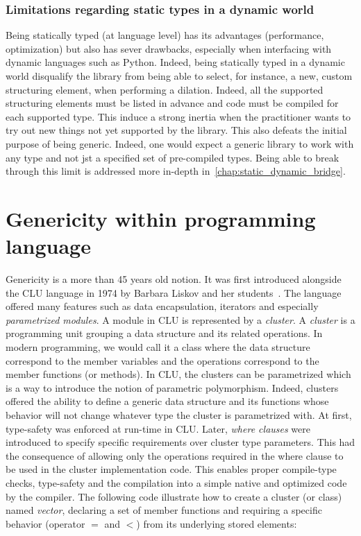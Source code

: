 \subsubsection{Limitations regarding static types in a dynamic world}

Being statically typed (at language level) has its advantages (performance, optimization) but also has sever drawbacks,
especially when interfacing with dynamic languages such as Python. Indeed, being statically typed in a dynamic world
disqualify the library from being able to select, for instance, a new, custom structuring element, when performing a
dilation. Indeed, all the supported structuring elements must be listed in advance and code must be compiled for each
supported type. This induce a strong inertia when the practitioner wants to try out new things not yet supported by the
library. This also defeats the initial purpose of being generic. Indeed, one would expect a generic library to work with
any type and not jst a specified set of pre-compiled types. Being able to break through this limit is addressed more
in-depth in~\cref{chap:static_dynamic_bridge}.




\section{Genericity within programming language}
\label{sec:gen.genericity.within.programming.languages}

Genericity is a more than 45 years old notion. It was first introduced alongside the CLU language in 1974 by Barbara
Liskov and her students~\parencite{liskov.1993.cluart}. The language offered many features such as data encapsulation,
iterators and especially \emph{parametrized modules}. A module in CLU is represented by a \emph{cluster}. A
\emph{cluster} is a programming unit grouping a data structure and its related operations. In modern programming, we
would call it a class where the data structure correspond to the member variables and the operations correspond to the
member functions (or methods). In CLU, the clusters can be parametrized which is a way to introduce the notion of
parametric polymorphism. Indeed, clusters offered the ability to define a generic data structure and its functions whose
behavior will not change whatever type the cluster is parametrized with. At first, type-safety was enforced at run-time
in CLU. Later, \emph{where clauses} were introduced to specify specific requirements over cluster type parameters. This
had the consequence of allowing only the operations required in the where clause to be used in the cluster
implementation code. This enables proper compile-type checks, type-safety and the compilation into a simple native and
optimized code by the compiler. The following code illustrate how to create a cluster (or class) named \emph{vector},
declaring a set of member functions and requiring a specific behavior (operator $=$ and $<$) from its underlying stored
elements:


